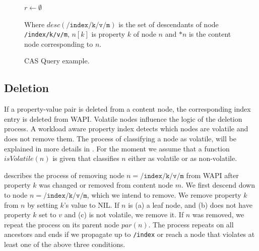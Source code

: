 \documentclass[abstracton,12pt]{scrartcl}
\theoremstyle{definition}
\begin{document}
\begin{figure}[h]
\begin{multicols}{2}
\begin{algorithm}[H]
\begin{scriptsize}
                $r \longleftarrow \emptyset$\;
                \;
            \end{scriptsize}
        \end{algorithm}
        \begin{scriptsize}
            Where $desc(\texttt{/index/k/v/m})$ is the set of descendants of node \texttt{/index/k/v/m}, $n[k]$ is property $k$ of node $n$ and $*n$ is the content node corresponding to $n$.
        \end{scriptsize}
    \end{multicols}
    \caption{CAS Query example.}
    \label{fig:cas_query}
\end{figure}

\newpage

\subsection{Deletion}

If a property-value pair is deleted from a content node, the corresponding index entry is deleted from WAPI.
Volatile nodes influence the logic of the deletion process.
A workload aware property index detects which nodes are volatile and does not remove them.
The process of classifying a node as volatile, will be explained in more details in .
For the moment we assume that a function $isVolatile(n)$ is given that classifies $n$ either as volatile or as non-volatile.

 describes the process of removing node $n = \texttt{/index/k/v/m}$ from WAPI after property $k$ was changed or removed from content node $m$.
We first descend down to node $n = \texttt{/index/k/v/m}$, which we intend to remove.
We remove property $k$ from $n$ by setting $k$'s value to \textsc{NIL}.
If $n$ is (a) a leaf node, and (b) does not have property $k$ set to $v$ and (c) is not volatile, we remove it.
If $n$ was removed, we repeat the process on its parent node $par(n)$.
The process repeats on all ancestors and ends if we propagate up to \texttt{/index} or reach a node that violates at least one of the above three conditions.
\end{document}
